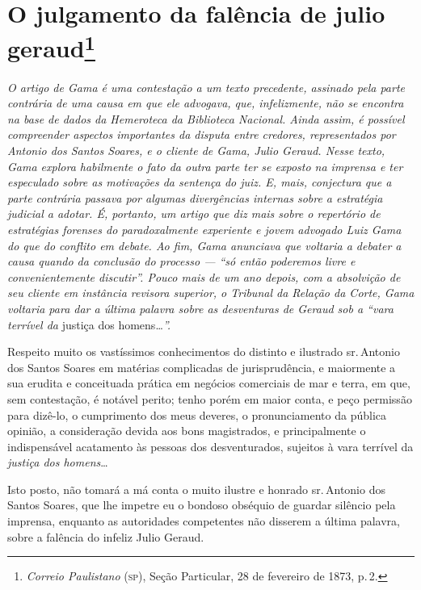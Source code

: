 \chapter{O julgamento da falência de julio geraud\footnote{\emph{Correio Paulistano} (\textsc{sp}), Seção Particular,
  28 de fevereiro de 1873, p.\,2.}} %

\begin{didascalia}
\emph{O artigo de Gama é uma contestação a um texto precedente, assinado
pela parte contrária de uma causa em que ele advogava, que,
infelizmente, não se encontra na base de dados da Hemeroteca da
Biblioteca Nacional. Ainda assim, é possível compreender aspectos
importantes da disputa entre credores, representados por Antonio dos
Santos Soares, e o cliente de Gama, Julio Geraud. Nesse texto, Gama
explora habilmente o fato da outra parte ter se exposto na imprensa e
ter especulado sobre as motivações da sentença do juiz. E, mais,
conjectura que a parte contrária passava por algumas divergências
internas sobre a estratégia judicial a adotar. É, portanto, um artigo
que diz mais sobre o repertório de estratégias forenses do
paradoxalmente experiente e jovem advogado Luiz Gama do que do conflito
em debate. Ao fim, Gama anunciava que voltaria a debater a causa quando
da conclusão do processo --- ``só então poderemos livre e convenientemente
discutir''. Pouco mais de um ano depois, com a absolvição de seu cliente
em instância revisora superior, o Tribunal da Relação da Corte, Gama
voltaria para dar a última palavra sobre as desventuras de Geraud sob a
``vara terrível da} justiça dos homens\ldots{}\emph{''.}
\end{didascalia}

Respeito muito os vastíssimos conhecimentos do distinto e ilustrado sr.\,Antonio dos Santos Soares em matérias complicadas de jurisprudência, e
maiormente a sua erudita e conceituada prática em negócios comerciais de
mar e terra, em que, sem contestação, é notável perito; tenho porém em
maior conta, e peço permissão para dizê-lo, o cumprimento dos meus
deveres, o pronunciamento da pública opinião, a consideração devida aos
bons magistrados, e principalmente o indispensável acatamento às pessoas
dos desventurados, sujeitos à vara terrível da \emph{justiça dos
homens}\ldots{}

Isto posto, não tomará a má conta o muito ilustre e honrado sr.\,Antonio
dos Santos Soares, que lhe impetre eu o bondoso obséquio de guardar
silêncio pela imprensa, enquanto as autoridades competentes não disserem
a última palavra, sobre a falência do infeliz Julio Geraud.

